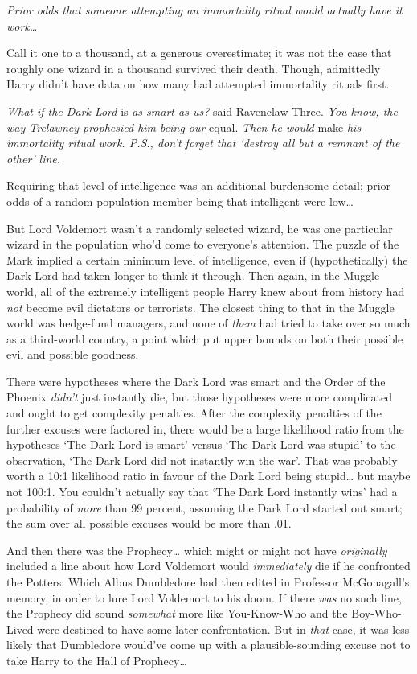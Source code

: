 \emph{Prior odds that someone attempting an immortality ritual would actually
have it work{\ldots}}

Call it one to a thousand, at a generous overestimate; it was not the case that
roughly one wizard in a thousand survived their death. Though, admittedly Harry
didn't have data on how many had attempted immortality rituals first.

\emph{What if the Dark Lord} is \emph{as smart as us?} said Ravenclaw Three.
\emph{You know, the way Trelawney prophesied him being our} equal. \emph{Then
he would} make \emph{his immortality ritual work. P.S., don't forget that
`destroy all but a remnant of the other' line.}

Requiring that level of intelligence was an additional burdensome detail; prior
odds of a random population member being that intelligent were low{\ldots}

But Lord Voldemort wasn't a randomly selected wizard, he was one particular
wizard in the population who'd come to everyone's attention. The puzzle of the
Mark implied a certain minimum level of intelligence, even if (hypothetically)
the Dark Lord had taken longer to think it through. Then again, in the Muggle
world, all of the extremely intelligent people Harry knew about from history
had \emph{not} become evil dictators or terrorists. The closest thing to that
in the Muggle world was hedge-fund managers, and none of \emph{them} had tried
to take over so much as a third-world country, a point which put upper bounds
on both their possible evil and possible goodness.

There were hypotheses where the Dark Lord was smart and the Order of the
Phoenix \emph{didn't} just instantly die, but those hypotheses were more
complicated and ought to get complexity penalties. After the complexity
penalties of the further excuses were factored in, there would be a large
likelihood ratio from the hypotheses `The Dark Lord is smart' versus `The Dark
Lord was stupid' to the observation, `The Dark Lord did not instantly win the
war'. That was probably worth a 10:1 likelihood ratio in favour of the Dark Lord
being stupid{\ldots} but maybe not 100:1. You couldn't actually say that `The
Dark Lord instantly wins' had a probability of \emph{more} than 99 percent,
assuming the Dark Lord started out smart; the sum over all possible excuses
would be more than .01.

And then there was the Prophecy{\ldots} which might or might not have
\emph{originally} included a line about how Lord Voldemort would
\emph{immediately} die if he confronted the Potters. Which Albus Dumbledore had
then edited in Professor McGonagall's memory, in order to lure Lord Voldemort
to his doom. If there \emph{was} no such line, the Prophecy did sound
\emph{somewhat} more like You-Know-Who and the Boy-Who-Lived were destined to
have some later confrontation. But in \emph{that} case, it was less likely that
Dumbledore would've come up with a plausible-sounding excuse not to take Harry
to the Hall of Prophecy{\ldots}

